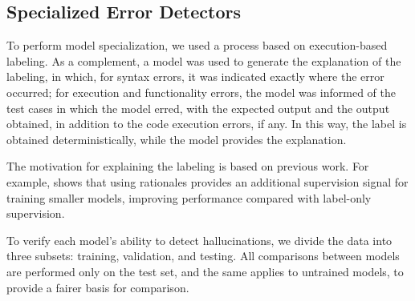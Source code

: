 \subsection{Specialized Error Detectors}
To perform model specialization, we used a process based on execution-based labeling. As a complement, a model was used to generate the explanation of the labeling, in which, for syntax errors, it was indicated exactly where the error occurred; for execution and functionality errors, the model was informed of the test cases in which the model erred, with the expected output and the output obtained, in addition to the code execution errors, if any. In this way, the label is obtained deterministically, while the model provides the explanation.

The motivation for explaining the labeling is based on previous work. For example, \citep{hsieh-etal-2023-distilling} shows that using rationales provides an additional supervision signal for training smaller models, improving performance compared with label-only supervision.

To verify each model's ability to detect hallucinations, we divide the data into three subsets: training, validation, and testing. All comparisons between models are performed only on the test set, and the same applies to untrained models, to provide a fairer basis for comparison.